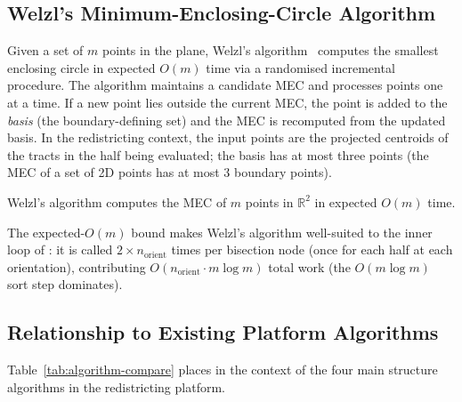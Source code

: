 \subsection{Welzl's Minimum-Enclosing-Circle Algorithm}
\label{subsec:welzl}

Given a set of $m$ points in the plane, Welzl's algorithm~\citep{welzl1991}
computes the smallest enclosing circle in expected $O(m)$ time via a
randomised incremental procedure.
The algorithm maintains a candidate MEC and processes points one at a time.
If a new point lies outside the current MEC, the point is added to the
\emph{basis} (the boundary-defining set) and the MEC is recomputed from the
updated basis.
In the redistricting context, the input points are the projected centroids
of the tracts in the half being evaluated; the basis has at most three points
(the MEC of a set of 2D points has at most 3 boundary points).

\begin{proposition}
\label{prop:welzl}
Welzl's algorithm computes the MEC of $m$ points in $\mathbb{R}^2$ in
expected $O(m)$ time.
\end{proposition}

The expected-$O(m)$ bound makes Welzl's algorithm well-suited to the inner
loop of \mka{}: it is called $2 \times n_{\mathrm{orient}}$ times per bisection
node (once for each half at each orientation), contributing $O(n_{\mathrm{orient}} \cdot m \log m)$
total work (the $O(m \log m)$ sort step dominates).

\subsection{Relationship to Existing Platform Algorithms}
\label{subsec:related}

Table~\ref{tab:algorithm-compare} places \mka{} in the context of the four
main structure algorithms in the redistricting platform.

